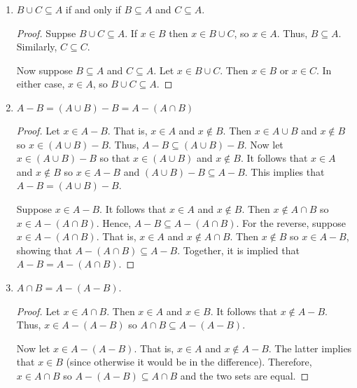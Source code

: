 \documentclass[class=report, crop=false]{standalone}
\begin{document}
\begin{solution}
\begin{enumerate}[label=({\alph*})]
      \item \(B \cup C \subseteq A\) if and only if \(B \subseteq A\) and \(C \subseteq A\).

      \begin{proof}
        Suppse \(B \cup C \subseteq A\). If \(x \in B\) then \(x \in B \cup C\), so \(x \in A\). Thus, \(B \subseteq A\). Similarly, \(C \subseteq C\).

        Now suppose \(B \subseteq A\) and \(C \subseteq A\). Let \(x \in B \cup C\). Then \(x \in B\) or \(x \in C\).
        In either case, \(x \in A\), so \(B \cup C \subseteq A\).
      \end{proof}

      \item \(A - B = (A \cup B) - B = A - (A \cap B)\)

      \begin{proof}
        Let \(x \in A - B\). That is, \(x \in A\) and \(x \notin B\). Then \(x \in A \cup B\) and \(x \notin B\) so \(x \in (A \cup B) - B\). Thus, \(A - B \subseteq (A \cup B) - B\).
        Now let \(x \in (A \cup B) - B\) so that \(x \in (A \cup B)\) and \(x \notin B\). It follows that \(x \in A\) and \(x \notin B\) so \(x \in A - B\) and \((A \cup B) - B \subseteq A - B\).
        This implies that \(A - B = (A \cup B) - B\).

        Suppose \(x \in A - B\). It follows that \(x \in A\) and \(x \notin B\). Then \(x \notin A \cap B\) so \(x \in A - (A \cap B)\). Hence, \(A - B \subseteq A - (A \cap B)\).
        For the reverse, suppose \(x \in A - (A \cap B)\). That is, \(x \in A\) and \(x \notin A \cap B\). Then \(x \notin B\) so \(x \in A - B\), showing that \(A - (A \cap B) \subseteq A - B\).
        Together, it is implied that \(A - B = A - (A \cap B)\).
      \end{proof}

      \item \(A \cap B = A - (A - B)\).

      \begin{proof}
        Let \(x \in A \cap B\). Then \(x \in A\) and \(x \in B\). It follows that \(x \notin A - B\). Thus, \(x \in A - (A - B)\) so \(A \cap B \subseteq A - (A - B)\).

        Now let \(x \in A - (A - B)\). That is, \(x \in A\) and \(x \notin A - B\). The latter implies that \(x \in B\) (since otherwise it would be in the difference).
        Therefore, \(x \in A \cap B\) so \(A - (A - B) \subseteq A \cap B\) and the two sets are equal.
      \end{proof}


\end{enumerate}
\end{solution}
\end{document}
